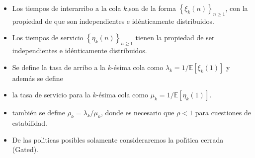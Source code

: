 \documentclass{article}
\newcommand{\esp}{\mathbb{E}}
\numberwithin{equation}{section}
\begin{document}
\begin{itemize}
\item Los tiempos de interarribo a la cola $k$,son de la forma $\left\{\xi_{k}\left(n\right)\right\}_{n\geq1}$, con la propiedad de que son independientes e id{\'e}nticamente distribuidos.

\item Los tiempos de servicio $\left\{\eta_{k}\left(n\right)\right\}_{n\geq1}$ tienen la propiedad de ser independientes e id{\'e}nticamente distribuidos.

\item Se define la tasa de arribo a la $k$-{\'e}sima cola como $\lambda_{k}=1/\esp\left[\xi_{k}\left(1\right)\right]$ y adem{\'a}s se define

\item la tasa de servicio para la $k$-{\'e}sima cola como $\mu_{k}=1/\esp\left[\eta_{k}\left(1\right)\right]$.

\item tambi{\'e}n se define $\rho_{k}=\lambda_{k}/\mu_{k}$, donde es necesario que $\rho<1$ para cuestiones de estabilidad.

\item De las pol{\'\i}ticas posibles solamente consideraremos la pol{\'\i}tica cerrada (Gated).
\end{itemize}
\end{document}
